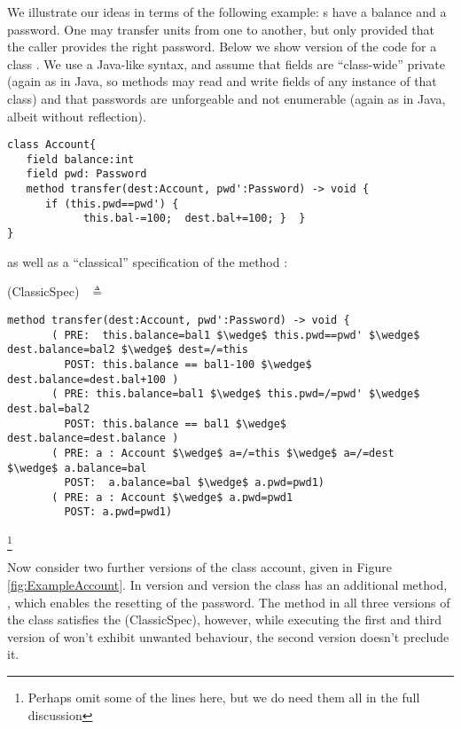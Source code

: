 We illustrate our ideas in terms of the following example:
s have a balance and a password. One may transfer
 units from one  to another, but only provided
that the caller provides the right password. Below we show version
 of the code for a class .  We use a Java-like
syntax, and assume that fields are ``class-wide'' private (again as in
Java, so methods may read and write fields of any instance of that
class) and that passwords are unforgeable and not enumerable (again as
in Java, albeit without reflection).

 
\begin{lstlisting}
class Account{
   field balance:int 
   field pwd: Password 
   method transfer(dest:Account, pwd':Password) -> void {
      if (this.pwd==pwd') {
            this.bal-=100;  dest.bal+=100; }  }
}
\end{lstlisting}

as well as a ``classical'' specification of the method :


 (ClassicSpec)$  \ \ $  $\triangleq$

\begin{lstlisting}[mathescape=true, frame=lines]
  method transfer(dest:Account, pwd':Password) -> void {
       ( PRE:  this.balance=bal1 $\wedge$ this.pwd==pwd' $\wedge$ dest.balance=bal2 $\wedge$ dest=/=this 
         POST: this.balance == bal1-100 $\wedge$  dest.balance=dest.bal+100 )
       ( PRE: this.balance=bal1 $\wedge$ this.pwd=/=pwd' $\wedge$ dest.bal=bal2
         POST: this.balance == bal1 $\wedge$  dest.balance=dest.balance )
       ( PRE: a : Account $\wedge$ a=/=this $\wedge$ a=/=dest  $\wedge$ a.balance=bal  
         POST:  a.balance=bal $\wedge$ a.pwd=pwd1)
       ( PRE: a : Account $\wedge$ a.pwd=pwd1  
         POST: a.pwd=pwd1)       
\end{lstlisting}\footnote{Perhaps omit some of the lines here, but we do need them all in the full discussion}
 
  
 
 Now consider two further versions of the class account, given in Figure \ref{fig:ExampleAccount}.
 In version {} and version {} the class has an additional method, , which enables the resetting of the password.
The method  in all three versions of the class  satisfies the (ClassicSpec), 
however, while executing the first and third version of  won't exhibit unwanted behaviour, the second version doesn't preclude it.
  

